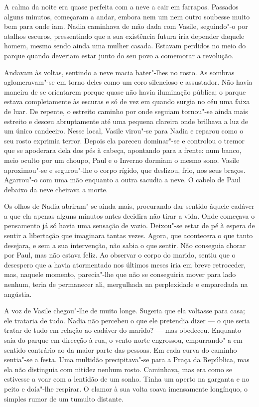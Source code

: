 A calma da noite era quase perfeita com a neve a cair em farrapos.
Passados alguns minutos, começaram a andar, embora nem um nem outro
soubesse muito bem para onde iam. Nadia caminhava de mão dada com
Vasile, seguindo"-o por atalhos escuros, pressentindo que a sua
existência futura iria depender daquele homem, mesmo sendo ainda uma
mulher casada. Estavam perdidos no meio do parque quando deveriam estar
junto do seu povo a comemorar a revolução.

Andavam às voltas, sentindo a neve macia bater"-lhes no rosto. As sombras
aglomeravam"-se em torno deles como um coro silencioso e assustador. Não
havia maneira de se orientarem porque quase não havia iluminação
pública; o parque estava completamente às escuras e só de vez em quando
surgia no céu uma faixa de luar. De repente, o estreito caminho por onde seguiam tornou"-se ainda mais estreito e desceu
abruptamente até uma pequena clareira onde brilhava a luz de um único
candeeiro. Nesse local, Vasile virou"-se para Nadia e reparou como o seu
rosto exprimia terror. Depois ela pareceu dominar"-se e controlou o
tremor que se apoderara dela dos pés à cabeça, apontando para a
frente: num banco, meio oculto por um choupo, Paul e o Inverno dormiam o
mesmo sono. Vasile aproximou"-se e segurou"-lhe o corpo rígido, que
deslizou, frio, nos seus braços. Agarrou"-o com uma mão enquanto a outra
sacudia a neve. O cabelo de Paul debaixo da neve cheirava a morte.

Os olhos de Nadia abriram"-se ainda mais, procurando dar sentido àquele
cadáver a que ela apenas alguns minutos antes decidira não tirar a
vida. Onde começava o pensamento já só havia uma sensação de vazio.
Deixou"-se estar de pé à espera de sentir a libertação que imaginara
tantas vezes. Agora, que acontecera o que tanto desejara, e sem a sua
intervenção, não sabia o que sentir. Não conseguia chorar por Paul,
mas não estava feliz. Ao observar o corpo do marido, sentiu que o
desespero que a havia atormentado nos últimos meses iria em breve
retroceder, mas, naquele momento, parecia"-lhe que não se conseguiria
mover para lado nenhum, teria de permanecer ali, mergulhada na
perplexidade e emparedada na angústia.

A voz de Vasile chegou"-lhe de muito longe. Sugeria que
ela voltasse para casa; ele trataria de tudo. Nadia não percebeu o que
ele pretendia dizer --- o que seria tratar de tudo em relação ao cadáver
do marido? --- mas obedeceu. Enquanto saía do parque em direcção à rua, o
vento norte
engrossou, empurrando"-a em sentido contrário ao da maior parte das
pessoas. Em cada curva do caminho sentia"-se a festa. Uma multidão
precipitava"-se para a Praça da República, mas ela não distinguia com
nitidez nenhum rosto. Caminhava, mas era como se estivesse a voar com a
lentidão de um sonho. Tinha um aperto na garganta e no peito e
doía"-lhe respirar. O clamor à sua volta soava imensamente longínquo, o
simples rumor de um tumulto distante.

